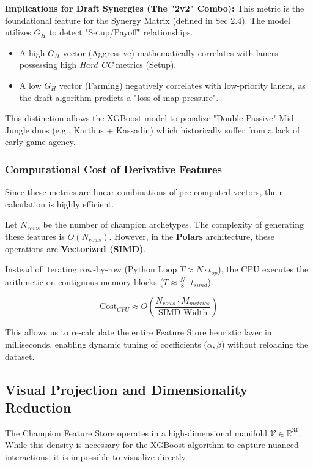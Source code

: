 \documentclass[12pt, a4paper]{article}
\begin{document}
    \textbf{Implications for Draft Synergies (The "2v2" Combo):}
    This metric is the foundational feature for the Synergy Matrix (defined in Sec 2.4). The model utilizes $G_H$ to detect "Setup/Payoff" relationships.
    \begin{itemize}
        \item A high $G_H$ vector (Aggressive) mathematically correlates with laners possessing high \textit{Hard CC} metrics (Setup).
        \item A low $G_H$ vector (Farming) negatively correlates with low-priority laners, as the draft algorithm predicts a "loss of map pressure".
    \end{itemize}

    This distinction allows the XGBoost model to penalize "Double Passive" Mid-Jungle duos (e.g., Karthus + Kassadin) which historically suffer from a lack of early-game agency.

    \subsubsection{Computational Cost of Derivative Features}
    Since these metrics are linear combinations of pre-computed vectors, their calculation is highly efficient.

    Let $N_{rows}$ be the number of champion archetypes. The complexity of generating these features is $O(N_{rows})$. However, in the \textbf{Polars} architecture, these operations are \textbf{Vectorized (SIMD)}.

    Instead of iterating row-by-row (Python Loop $T \approx N \cdot t_{op}$), the CPU executes the arithmetic on contiguous memory blocks ($T \approx \frac{N}{8} \cdot t_{simd}$).

    \begin{equation}
        \text{Cost}_{CPU} \approx O\left(\frac{N_{rows} \cdot M_{metrics}}{\text{SIMD\_Width}}\right)
    \end{equation}

    This allows us to re-calculate the entire Feature Store heuristic layer in milliseconds, enabling dynamic tuning of coefficients ($\alpha, \beta$) without reloading the dataset.

    \subsection{Visual Projection and Dimensionality Reduction}

    The Champion Feature Store operates in a high-dimensional manifold $\mathcal{V} \in \mathbb{R}^{34}$. While this density is necessary for the XGBoost algorithm to capture nuanced interactions, it is impossible to visualize directly.
\end{document}
